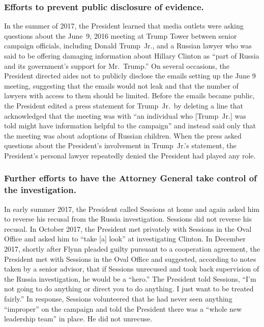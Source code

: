 \subsubsection*{Efforts to prevent public disclosure of evidence.}

In the summer of 2017, the President learned that media outlets were asking questions about the June~9, 2016 meeting at Trump Tower between senior campaign officials, including Donald Trump~Jr., and a Russian lawyer who was said to be offering damaging information about Hillary Clinton as ``part of Russia and its government's support for Mr.~Trump.''
On several occasions, the President directed aides not to publicly disclose the emails setting up the June 9 meeting, suggesting that the emails would not leak and that the number of lawyers with access to them should be limited.
Before the emails became public, the President edited a press statement for Trump~Jr.\ by deleting a line that acknowledged that the meeting was with ``an individual who [Trump~Jr.] was told might have information helpful to the campaign'' and instead said only that the meeting was about adoptions of Russian children.
When the press asked questions about the President's involvement in Trump~Jr.'s statement, the President's personal lawyer repeatedly denied the President had played any role.

\subsubsection*{Further efforts to have the Attorney General take control of the investigation.}

In early summer 2017, the President called Sessions at home and again asked him to reverse his recusal from the Russia investigation. Sessions did not reverse his recusal.
In October 2017, the President met privately with Sessions in the Oval Office and asked him to ``take [a] look'' at investigating Clinton.
In December 2017, shortly after Flynn pleaded guilty pursuant to a cooperation agreement, the President met with Sessions in the Oval Office and suggested, according to notes taken by a senior advisor, that if Sessions unrecused and took back supervision of the Russia investigation, he would be a ``hero.''
The President told Sessions, ``I'm not going to do anything or direct you to do anything.
I just want to be treated fairly.''
In response, Sessions volunteered that he had never seen anything ``improper'' on the campaign and told the President there was a ``whole new leadership team'' in place.
He did not unrecuse.

